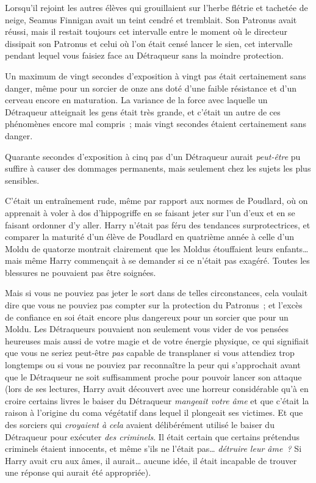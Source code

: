 Lorsqu'il rejoint les autres élèves qui grouillaient sur l'herbe flétrie et tachetée de neige, Seamus Finnigan avait un teint cendré et tremblait. Son Patronus avait réussi, mais il restait toujours cet intervalle entre le moment où le directeur dissipait son Patronus et celui où l'on était censé lancer le sien, cet intervalle pendant lequel vous faisiez face au Détraqueur sans la moindre protection.

Un maximum de vingt secondes d'exposition à vingt pas était certainement sans danger, même pour un sorcier de onze ans doté d'une faible résistance et d'un cerveau encore en maturation. La variance de la force avec laquelle un Détraqueur atteignait les gens était très grande, et c'était un autre de ces phénomènes encore mal compris~; mais vingt secondes étaient certainement sans danger.

Quarante secondes d'exposition à cinq pas d'un Détraqueur aurait \emph{peut-être} pu suffire à causer des dommages permanents, mais seulement chez les sujets les plus sensibles.

C'était un entraînement rude, même par rapport aux normes de Poudlard, où on apprenait à voler à dos d'hippogriffe en se faisant jeter sur l'un d'eux et en se faisant ordonner d'y aller. Harry n'était pas féru des tendances surprotectrices, et comparer la maturité d'un élève de Poudlard en quatrième année à celle d'un Moldu de quatorze montrait clairement que les Moldus étouffaient leurs enfants… mais même Harry commençait à se demander si ce n'était pas exagéré. Toutes les blessures ne pouvaient pas être soignées.

Mais si vous ne pouviez pas jeter le sort dans de telles circonstances, cela voulait dire que vous ne pouviez pas compter sur la protection du Patronus~; et l'excès de confiance en soi était encore plus dangereux pour un sorcier que pour un Moldu. Les Détraqueurs pouvaient non seulement vous vider de vos pensées heureuses mais aussi de votre magie et de votre énergie physique, ce qui signifiait que vous ne seriez peut-être \emph{pas} capable de transplaner si vous attendiez trop longtemps ou si vous ne pouviez par reconnaître la peur qui s'approchait avant que le Détraqueur ne soit suffisamment proche pour pouvoir lancer son attaque (lors de ses lectures, Harry avait découvert avec une horreur considérable qu'à en croire certains livres le baiser du Détraqueur \emph{mangeait votre âme} et que c'était la raison à l'origine du coma végétatif dans lequel il plongeait ses victimes. Et que des sorciers qui \emph{croyaient à cela} avaient délibérément utilisé le baiser du Détraqueur pour exécuter \emph{des criminels}. Il était certain que certains prétendus criminels étaient innocents, et même s'ils ne l'était pas… \emph{détruire leur âme~?} Si Harry avait cru aux âmes, il aurait… aucune idée, il était incapable de trouver une réponse qui aurait été appropriée).

